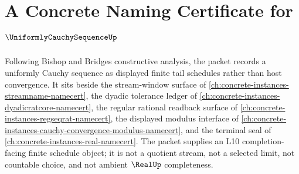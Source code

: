 \chapter{A Concrete Naming Certificate for $\UniformlyCauchySequenceUp$}
\label{ch:concrete-instances-uniformly-cauchy-sequence-namecert}

Following Bishop and Bridges constructive analysis, the packet records a uniformly Cauchy sequence as displayed finite tail schedules rather than host convergence. It sits beside the stream-window surface of \autoref{ch:concrete-instances-streamname-namecert}, the dyadic tolerance ledger of \autoref{ch:concrete-instances-dyadicratcore-namecert}, the regular rational readback surface of \autoref{ch:concrete-instances-regseqrat-namecert}, the displayed modulus interface of \autoref{ch:concrete-instances-cauchy-convergence-modulus-namecert}, and the terminal seal of \autoref{ch:concrete-instances-real-namecert}. The packet supplies an L10 completion-facing finite schedule object; it is not a quotient stream, not a selected limit, not countable choice, and not ambient $\RealUp$ completeness.

